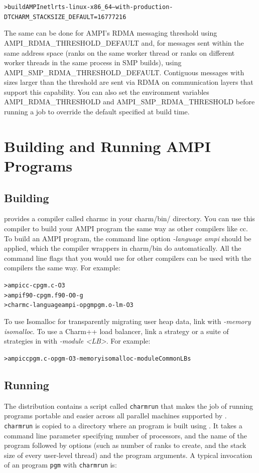 \documentclass[10pt]{article}
\begin{document}
\begin{alltt}
> build AMPI netlrts-linux-x86_64 --with-production -DTCHARM_STACKSIZE_DEFAULT=16777216
\end{alltt}

The same can be done for AMPI's RDMA messaging threshold using AMPI_RDMA_THRESHOLD_DEFAULT and,
for messages sent within the same address space (ranks on the same worker thread or ranks
on different worker threads in the same process in SMP builds), using AMPI_SMP_RDMA_THRESHOLD_DEFAULT.
Contiguous messages with sizes larger than the threshold are sent via RDMA on communication layers that
support this capability. You can also set the environment variables AMPI_RDMA_THRESHOLD and AMPI_SMP_RDMA_THRESHOLD
before running a job to override the default specified at build time.

\section{Building and Running AMPI Programs}
\subsection{Building}
\charmpp{} provides a compiler called charmc in your charm/bin/ directory.
You can use this compiler to build your AMPI program the same way as other
compilers like cc. To build an AMPI program, the command line option
\emph{-language ampi} should be applied, which the \ampi{} compiler wrappers
in charm/bin do automatically. All the command line flags that you would use
for other compilers can be used with the \ampi{} compilers the same way.
For example:

\begin{alltt}
> ampicc -c pgm.c -O3
> ampif90 -c pgm.f90 -O0 -g
> charmc -language ampi -o pgm pgm.o -lm -O3 
\end{alltt}

To use Isomalloc for transparently migrating user heap data, link with
\emph{-memory isomalloc}. To use a Charm++ load balancer, link a strategy
or a suite of strategies in with \emph{-module \textless LB\textgreater}. For example:

\begin{alltt}
> ampicc pgm.c -o pgm -O3 -memory isomalloc -module CommonLBs
\end{alltt}


\subsection{Running}
The \charmpp{} distribution contains a script called \texttt{charmrun} that
makes the job of running \ampi{} programs portable and easier across all
parallel machines supported by \charmpp{}. \texttt{charmrun} is copied to a
directory where an \ampi{} program is built using \charmc{}. It takes a command
line parameter specifying number of processors, and the name of the program
followed by \ampi{} options (such as number of ranks to create, and the stack size
of every user-level thread) and the program arguments. A typical invocation of an \ampi{}
program \texttt{pgm} with \texttt{charmrun} is:
\end{document}
